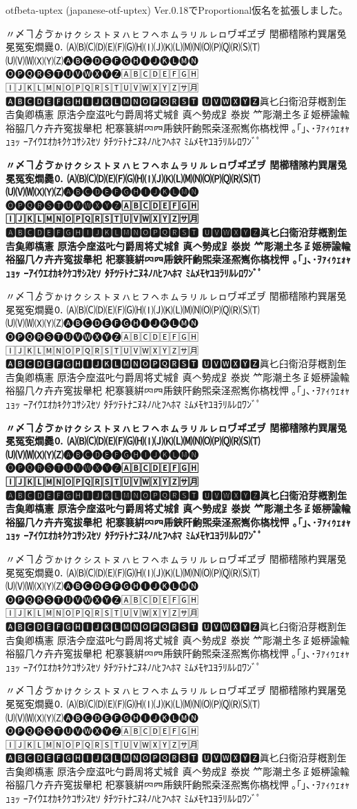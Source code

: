 \documentclass[a4paper,titlepage, draft]{\class}
\begin{document}
\ifuptexmode
otfbeta-uptex (japanese-otf-uptex) Ver.0.18でProportional仮名を拡張しました。

{\propshape
\noindent 〃〆ヿゟゔゕゖㇰㇱㇲㇳㇴㇵㇶㇷㇸㇹㇺㇻㇼㇽㇾㇿヷヸヹヺ
𨳝櫛𥡴𨻶杓巽屠兔冕冤𡨚𤏐爨🄀
🄐🄑🄒🄓🄔🄕🄖🄗🄘🄙🄚🄛🄜🄝🄞🄟🄠🄡🄢🄣
🄤🄥🄦🄧🄨🄩🅐🅑🅒🅓🅔🅕🅖🅗🅘🅙🅚🅛🅜🅝
🅞🅟🅠🅡🅢🅣🅤🅥🅦🅧🅨🅩🄰🄱🄲🄳🄴🄵🄶🄷
🄸🄹🄺🄻🄼🄽🄾🄿🅀🅁🅂🅃🅄🅅🅆🅇🅈🅉🈂🈷
🅰🅱🅲🅳🅴🅵🅶🅷🅸🅹🅺🅻🅼🅽🅾🅿🆀🆁🆂🆃
🆄🆅🆆🆇🆈🆉眞𠤎𦥑𫟘沿芽槪割𦈢𠮷𩵋卿𫞎憲
𠩤浩𫝆𫝷滋𠮟勺爵周将𠀋城𩙿真𠆢𫝑成𧾷𣳾炭
𥫗彫潮𡈽冬𤴔姬𫞉諭輸𥙿𦚰𠘨𠂊𠦄卉寃拔𦦙𣏌
杞𪧦𫞽絣𠔿𦉪𠂰𨦇𨸗𫠚𤋮桒𣲾𠘑嶲你𣘺𣏾𢘉
｡｢｣､･ｦｧｨｩｪｫｬｭｮｯ
ｰｱｲｳｴｵｶｷｸｹｺｻｼｽｾｿ
ﾀﾁﾂﾃﾄﾅﾆﾇﾈﾉﾊﾋﾌﾍﾎﾏ
ﾐﾑﾒﾓﾔﾕﾖﾗﾘﾙﾚﾛﾜﾝﾞﾟ

\bfseries
\noindent 〃〆ヿゟゔゕゖㇰㇱㇲㇳㇴㇵㇶㇷㇸㇹㇺㇻㇼㇽㇾㇿヷヸヹヺ
𨳝櫛𥡴𨻶杓巽屠兔冕冤𡨚𤏐爨🄀
🄐🄑🄒🄓🄔🄕🄖🄗🄘🄙🄚🄛🄜🄝🄞🄟🄠🄡🄢🄣
🄤🄥🄦🄧🄨🄩🅐🅑🅒🅓🅔🅕🅖🅗🅘🅙🅚🅛🅜🅝
🅞🅟🅠🅡🅢🅣🅤🅥🅦🅧🅨🅩🄰🄱🄲🄳🄴🄵🄶🄷
🄸🄹🄺🄻🄼🄽🄾🄿🅀🅁🅂🅃🅄🅅🅆🅇🅈🅉🈂🈷
🅰🅱🅲🅳🅴🅵🅶🅷🅸🅹🅺🅻🅼🅽🅾🅿🆀🆁🆂🆃
🆄🆅🆆🆇🆈🆉眞𠤎𦥑𫟘沿芽槪割𦈢𠮷𩵋卿𫞎憲
𠩤浩𫝆𫝷滋𠮟勺爵周将𠀋城𩙿真𠆢𫝑成𧾷𣳾炭
𥫗彫潮𡈽冬𤴔姬𫞉諭輸𥙿𦚰𠘨𠂊𠦄卉寃拔𦦙𣏌
杞𪧦𫞽絣𠔿𦉪𠂰𨦇𨸗𫠚𤋮桒𣲾𠘑嶲你𣘺𣏾𢘉
｡｢｣､･ｦｧｨｩｪｫｬｭｮｯ
ｰｱｲｳｴｵｶｷｸｹｺｻｼｽｾｿ
ﾀﾁﾂﾃﾄﾅﾆﾇﾈﾉﾊﾋﾌﾍﾎﾏ
ﾐﾑﾒﾓﾔﾕﾖﾗﾘﾙﾚﾛﾜﾝﾞﾟ
}

{\gtfamily\mdseries\propshape
\noindent 〃〆ヿゟゔゕゖㇰㇱㇲㇳㇴㇵㇶㇷㇸㇹㇺㇻㇼㇽㇾㇿヷヸヹヺ
𨳝櫛𥡴𨻶杓巽屠兔冕冤𡨚𤏐爨🄀
🄐🄑🄒🄓🄔🄕🄖🄗🄘🄙🄚🄛🄜🄝🄞🄟🄠🄡🄢🄣
🄤🄥🄦🄧🄨🄩🅐🅑🅒🅓🅔🅕🅖🅗🅘🅙🅚🅛🅜🅝
🅞🅟🅠🅡🅢🅣🅤🅥🅦🅧🅨🅩🄰🄱🄲🄳🄴🄵🄶🄷
🄸🄹🄺🄻🄼🄽🄾🄿🅀🅁🅂🅃🅄🅅🅆🅇🅈🅉🈂🈷
🅰🅱🅲🅳🅴🅵🅶🅷🅸🅹🅺🅻🅼🅽🅾🅿🆀🆁🆂🆃
🆄🆅🆆🆇🆈🆉眞𠤎𦥑𫟘沿芽槪割𦈢𠮷𩵋卿𫞎憲
𠩤浩𫝆𫝷滋𠮟勺爵周将𠀋城𩙿真𠆢𫝑成𧾷𣳾炭
𥫗彫潮𡈽冬𤴔姬𫞉諭輸𥙿𦚰𠘨𠂊𠦄卉寃拔𦦙𣏌
杞𪧦𫞽絣𠔿𦉪𠂰𨦇𨸗𫠚𤋮桒𣲾𠘑嶲你𣘺𣏾𢘉
｡｢｣､･ｦｧｨｩｪｫｬｭｮｯ
ｰｱｲｳｴｵｶｷｸｹｺｻｼｽｾｿ
ﾀﾁﾂﾃﾄﾅﾆﾇﾈﾉﾊﾋﾌﾍﾎﾏ
ﾐﾑﾒﾓﾔﾕﾖﾗﾘﾙﾚﾛﾜﾝﾞﾟ

\bfseries\propshape
\noindent 〃〆ヿゟゔゕゖㇰㇱㇲㇳㇴㇵㇶㇷㇸㇹㇺㇻㇼㇽㇾㇿヷヸヹヺ
𨳝櫛𥡴𨻶杓巽屠兔冕冤𡨚𤏐爨🄀
🄐🄑🄒🄓🄔🄕🄖🄗🄘🄙🄚🄛🄜🄝🄞🄟🄠🄡🄢🄣
🄤🄥🄦🄧🄨🄩🅐🅑🅒🅓🅔🅕🅖🅗🅘🅙🅚🅛🅜🅝
🅞🅟🅠🅡🅢🅣🅤🅥🅦🅧🅨🅩🄰🄱🄲🄳🄴🄵🄶🄷
🄸🄹🄺🄻🄼🄽🄾🄿🅀🅁🅂🅃🅄🅅🅆🅇🅈🅉🈂🈷
🅰🅱🅲🅳🅴🅵🅶🅷🅸🅹🅺🅻🅼🅽🅾🅿🆀🆁🆂🆃
🆄🆅🆆🆇🆈🆉眞𠤎𦥑𫟘沿芽槪割𦈢𠮷𩵋卿𫞎憲
𠩤浩𫝆𫝷滋𠮟勺爵周将𠀋城𩙿真𠆢𫝑成𧾷𣳾炭
𥫗彫潮𡈽冬𤴔姬𫞉諭輸𥙿𦚰𠘨𠂊𠦄卉寃拔𦦙𣏌
杞𪧦𫞽絣𠔿𦉪𠂰𨦇𨸗𫠚𤋮桒𣲾𠘑嶲你𣘺𣏾𢘉
｡｢｣､･ｦｧｨｩｪｫｬｭｮｯ
ｰｱｲｳｴｵｶｷｸｹｺｻｼｽｾｿ
ﾀﾁﾂﾃﾄﾅﾆﾇﾈﾉﾊﾋﾌﾍﾎﾏ
ﾐﾑﾒﾓﾔﾕﾖﾗﾘﾙﾚﾛﾜﾝﾞﾟ
}

{\mgfamily\propshape
\noindent 〃〆ヿゟゔゕゖㇰㇱㇲㇳㇴㇵㇶㇷㇸㇹㇺㇻㇼㇽㇾㇿヷヸヹヺ
𨳝櫛𥡴𨻶杓巽屠兔冕冤𡨚𤏐爨🄀
🄐🄑🄒🄓🄔🄕🄖🄗🄘🄙🄚🄛🄜🄝🄞🄟🄠🄡🄢🄣
🄤🄥🄦🄧🄨🄩🅐🅑🅒🅓🅔🅕🅖🅗🅘🅙🅚🅛🅜🅝
🅞🅟🅠🅡🅢🅣🅤🅥🅦🅧🅨🅩🄰🄱🄲🄳🄴🄵🄶🄷
🄸🄹🄺🄻🄼🄽🄾🄿🅀🅁🅂🅃🅄🅅🅆🅇🅈🅉🈂🈷
🅰🅱🅲🅳🅴🅵🅶🅷🅸🅹🅺🅻🅼🅽🅾🅿🆀🆁🆂🆃
🆄🆅🆆🆇🆈🆉眞𠤎𦥑𫟘沿芽槪割𦈢𠮷𩵋卿𫞎憲
𠩤浩𫝆𫝷滋𠮟勺爵周将𠀋城𩙿真𠆢𫝑成𧾷𣳾炭
𥫗彫潮𡈽冬𤴔姬𫞉諭輸𥙿𦚰𠘨𠂊𠦄卉寃拔𦦙𣏌
杞𪧦𫞽絣𠔿𦉪𠂰𨦇𨸗𫠚𤋮桒𣲾𠘑嶲你𣘺𣏾𢘉
｡｢｣､･ｦｧｨｩｪｫｬｭｮｯ
ｰｱｲｳｴｵｶｷｸｹｺｻｼｽｾｿ
ﾀﾁﾂﾃﾄﾅﾆﾇﾈﾉﾊﾋﾌﾍﾎﾏ
ﾐﾑﾒﾓﾔﾕﾖﾗﾘﾙﾚﾛﾜﾝﾞﾟ
}

{\gtfamily\ebseries
\noindent 〃〆ヿゟゔゕゖㇰㇱㇲㇳㇴㇵㇶㇷㇸㇹㇺㇻㇼㇽㇾㇿヷヸヹヺ
𨳝櫛𥡴𨻶杓巽屠兔冕冤𡨚𤏐爨🄀
🄐🄑🄒🄓🄔🄕🄖🄗🄘🄙🄚🄛🄜🄝🄞🄟🄠🄡🄢🄣
🄤🄥🄦🄧🄨🄩🅐🅑🅒🅓🅔🅕🅖🅗🅘🅙🅚🅛🅜🅝
🅞🅟🅠🅡🅢🅣🅤🅥🅦🅧🅨🅩🄰🄱🄲🄳🄴🄵🄶🄷
🄸🄹🄺🄻🄼🄽🄾🄿🅀🅁🅂🅃🅄🅅🅆🅇🅈🅉🈂🈷
🅰🅱🅲🅳🅴🅵🅶🅷🅸🅹🅺🅻🅼🅽🅾🅿🆀🆁🆂🆃
🆄🆅🆆🆇🆈🆉眞𠤎𦥑𫟘沿芽槪割𦈢𠮷𩵋卿𫞎憲
𠩤浩𫝆𫝷滋𠮟勺爵周将𠀋城𩙿真𠆢𫝑成𧾷𣳾炭
𥫗彫潮𡈽冬𤴔姬𫞉諭輸𥙿𦚰𠘨𠂊𠦄卉寃拔𦦙𣏌
杞𪧦𫞽絣𠔿𦉪𠂰𨦇𨸗𫠚𤋮桒𣲾𠘑嶲你𣘺𣏾𢘉
｡｢｣､･ｦｧｨｩｪｫｬｭｮｯ
ｰｱｲｳｴｵｶｷｸｹｺｻｼｽｾｿ
ﾀﾁﾂﾃﾄﾅﾆﾇﾈﾉﾊﾋﾌﾍﾎﾏ
ﾐﾑﾒﾓﾔﾕﾖﾗﾘﾙﾚﾛﾜﾝﾞﾟ
}
\fi
\end{document}
